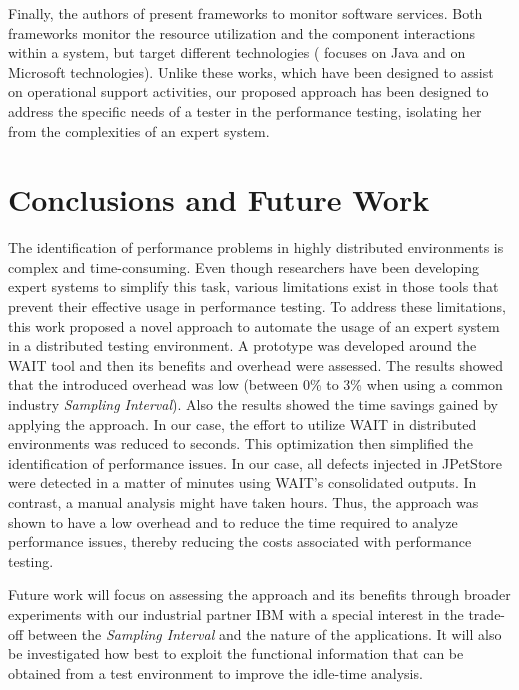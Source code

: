 \documentclass[runningheads,a4paper]{llncs}
\newcommand{\myspaceM}{-7.6pt}
\begin{document}
Finally, the authors of \cite{mon3,Barham1} present frameworks to
monitor software services. Both frameworks monitor the resource utilization and
the component interactions within a system, but target different technologies
(\cite{mon3} focuses on Java and \cite{Barham1} on Microsoft technologies).
Unlike these works, which have been designed to assist on operational support activities, 
our proposed approach has been designed to address the specific needs of a tester in the 
performance testing, isolating her from the complexities of an expert system.

\vspace{\myspaceM{}}
\section{Conclusions and Future Work}
\label{Conclusions}
\vspace{\myspaceM{}}

The identification of performance problems in highly
distributed environments is complex and time-consuming. Even though
researchers have been developing expert systems to simplify this task, various
limitations exist in those tools that prevent their effective usage in
performance testing. To address these limitations, this work proposed a novel
approach to automate the usage of an expert system in a distributed testing
environment. A prototype was developed around the WAIT tool and then its
benefits and overhead were assessed. The results showed that the introduced overhead was low 
(between 0\% to 3\% when using a common industry \emph{Sampling Interval}). Also
the results showed the time savings gained by applying the approach. In our case, the effort
to utilize WAIT in distributed environments was reduced to seconds. This optimization then simplified the identification of
performance issues. In our case, all defects injected in JPetStore were detected in a matter of minutes
using WAIT's consolidated outputs. In contrast, a manual analysis might have
taken hours. Thus, the approach was shown to have a low overhead and to reduce
the time required to analyze performance issues, thereby reducing the costs
associated with performance testing. 

Future work will focus on assessing the approach and its benefits through
broader experiments with our industrial partner IBM with a special interest in 
the trade-off between the \emph{Sampling Interval} and the nature of the
applications. It will also be investigated how best to exploit the functional 
information that can be obtained from a test environment to improve the
idle-time analysis.
\end{document}
